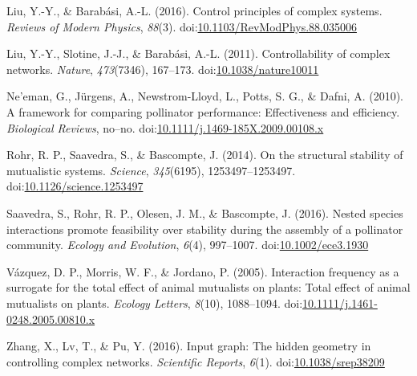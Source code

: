 \documentclass[a4paper]{artikel1}
\theoremstyle{definition}
\theoremstyle{definition}
\theoremstyle{definition}
\theoremstyle{remark}
\begin{document}
\hypertarget{ref-liu_control_2016}{}
Liu, Y.-Y., \& Barabási, A.-L. (2016). Control principles of complex
systems. \emph{Reviews of Modern Physics}, \emph{88}(3).
doi:\href{https://doi.org/10.1103/RevModPhys.88.035006}{10.1103/RevModPhys.88.035006}

\hypertarget{ref-liu_controllability_2011}{}
Liu, Y.-Y., Slotine, J.-J., \& Barabási, A.-L. (2011). Controllability
of complex networks. \emph{Nature}, \emph{473}(7346), 167--173.
doi:\href{https://doi.org/10.1038/nature10011}{10.1038/nature10011}

\hypertarget{ref-neeman_framework_2010}{}
Ne'eman, G., Jürgens, A., Newstrom-Lloyd, L., Potts, S. G., \& Dafni, A.
(2010). A framework for comparing pollinator performance: Effectiveness
and efficiency. \emph{Biological Reviews}, no--no.
doi:\href{https://doi.org/10.1111/j.1469-185X.2009.00108.x}{10.1111/j.1469-185X.2009.00108.x}

\hypertarget{ref-rohr_structural_2014}{}
Rohr, R. P., Saavedra, S., \& Bascompte, J. (2014). On the structural
stability of mutualistic systems. \emph{Science}, \emph{345}(6195),
1253497--1253497.
doi:\href{https://doi.org/10.1126/science.1253497}{10.1126/science.1253497}

\hypertarget{ref-saavedra_nested_2016}{}
Saavedra, S., Rohr, R. P., Olesen, J. M., \& Bascompte, J. (2016).
Nested species interactions promote feasibility over stability during
the assembly of a pollinator community. \emph{Ecology and Evolution},
\emph{6}(4), 997--1007.
doi:\href{https://doi.org/10.1002/ece3.1930}{10.1002/ece3.1930}

\hypertarget{ref-vazquez_interaction_2005}{}
Vázquez, D. P., Morris, W. F., \& Jordano, P. (2005). Interaction
frequency as a surrogate for the total effect of animal mutualists on
plants: Total effect of animal mutualists on plants. \emph{Ecology
Letters}, \emph{8}(10), 1088--1094.
doi:\href{https://doi.org/10.1111/j.1461-0248.2005.00810.x}{10.1111/j.1461-0248.2005.00810.x}

\hypertarget{ref-zhang_input_2016}{}
Zhang, X., Lv, T., \& Pu, Y. (2016). Input graph: The hidden geometry in
controlling complex networks. \emph{Scientific Reports}, \emph{6}(1).
doi:\href{https://doi.org/10.1038/srep38209}{10.1038/srep38209}
\end{document}
